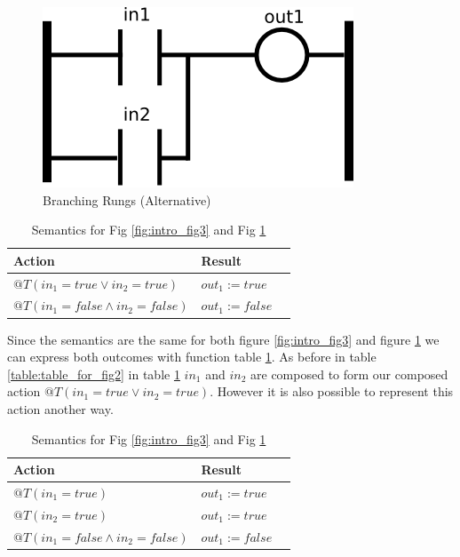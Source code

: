 \begin{figure}[htp]
    \centering
    \includegraphics[width=\imgsmall]{./images/intro_fig3a.png}
    \caption{Branching Rungs (Alternative)}
    \label{fig:intro_fig3a}
\end{figure}

\begin{table}[htp]
    \centering
       \begin{tabular}{|l|l|l|}
        \hline
        Action & Result \\
        \hline
        $@T(in_1 = true \vee in_2 = true)$ & $out_1 := true$ \\
        \hline
        $@T(in_1 = false \wedge in_2 = false)$ & $out_1 := false$\\
        \hline
    \end{tabular}
    \caption{Semantics for Fig \ref{fig:intro_fig3} and Fig \ref{fig:intro_fig3a}}
    \label{table:table_for_fig3}
\end{table}

Since the semantics are the same for both figure \ref{fig:intro_fig3} and figure \ref{fig:intro_fig3a} we can
express both outcomes with function table \ref{table:table_for_fig3}.
As before in table \ref{table:table_for_fig2} in table \ref{table:table_for_fig3} $in_1$ and $in_2$ are composed to form our composed action $@T(in_1 = true \vee in_2 = true)$. However it is also possible to represent this action another way.

\begin{table}[htp]
    \centering
       \begin{tabular}{|l|l|l|}
        \hline
        Action & Result \\
        \hline
        $@T(in_1 = true)$ & $out_1 := true$ \\
        \hline
        $@T(in_2 = true)$ & $out_1 := true$ \\
        \hline
        $@T(in_1 = false \wedge in_2 = false)$ & $out_1 := false$\\
        \hline
    \end{tabular}
    \caption{Semantics for Fig \ref{fig:intro_fig3} and Fig \ref{fig:intro_fig3a}}
    \label{table:table_for_fig3a}
\end{table}

